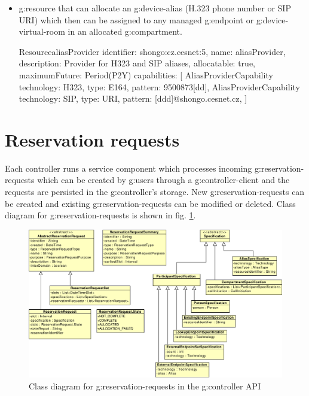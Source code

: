\begin{itemize}
\item \Gls{g:resource} that can allocate an \gls{g:device-alias} (H.323 phone number or SIP URI) which then can be assigned to any managed \gls{g:endpoint} or \gls{g:device-virtual-room} in an allocated \gls{g:compartment}.

\begin{ObjectCode}{Resource}{aliasProvider}{}
identifier: shongo:cz.cesnet:5,
name: aliasProvider,
description: Provider for H323 and SIP aliases,
allocatable: true,
maximumFuture: Period(P2Y)
capabilities: [  
  AliasProviderCapability {
    technology: H323,
    type: E164,
    pattern: 9500873[dd],
  }
  AliasProviderCapability {
    technology: SIP,
    type: URI,
    pattern: [ddd]@shongo.cesnet.cz,
  }
]
\end{ObjectCode}

\end{itemize}


\section{Reservation requests}

Each controller runs a service component which processes incoming \glspl{g:reservation-request} which can be created by \glspl{g:user} through a \gls{g:controller-client} and the requests are persisted in the \gls{g:controller}'s storage. New \glspl{g:reservation-request} can be created and existing \glspl{g:reservation-request} can be modified or deleted. Class diagram for \glspl{g:reservation-request} is shown in fig. \ref{fig:cd_api_reservation_requests}.

\begin{figure}[ht!]
\includegraphics[width=\textwidth]{diagrams/cd_api_reservation_requests}
\caption{Class diagram for \glspl{g:reservation-request} in the \gls{g:controller} API}
\label{fig:cd_api_reservation_requests}
\end{figure}

